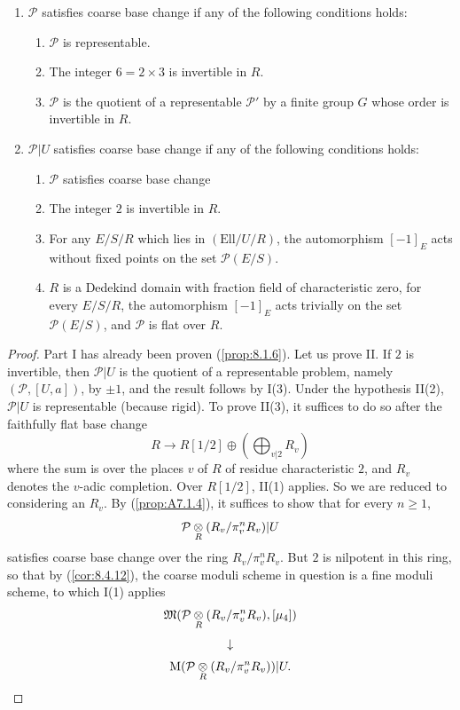 \begin{kthm}\label{thm:8.5.3}
\begin{enumerate}[label=(\Roman*), leftmargin=*]
\item $\mathcal{P}$ satisfies coarse base change if any of the following conditions holds:
\begin{enumerate}[label=(\arabic*), leftmargin=*]
\item $\mathcal{P}$ is representable.
\item The integer $6 = 2 \times 3$ is invertible in $R$.
\item $\mathcal{P}$ is the quotient of a representable $\mathcal{P}'$ by a finite group $G$ whose order is invertible in $R$.
\end{enumerate}
\item $\mathcal{P}|U$ satisfies coarse base change if any of the following conditions holds:
\begin{enumerate}[label=(\arabic*), start=0, leftmargin=*]
\item $\mathcal{P}$ satisfies coarse base change
\item The integer $2$ is invertible in $R$.
\item For any $E/S/R$ which lies in $(\mathrm{Ell}/U/R)$, the automorphism $[-1]_E$ acts without fixed points on the set $\mathcal{P}(E/S)$.
\item $R$ is a Dedekind domain with fraction field of characteristic zero, for every $E/S/R$, the automorphism $[-1]_E$ acts trivially on the set $\mathcal{P}(E/S)$, and $\mathcal{P}$ is flat over $R$.
\end{enumerate}
\end{enumerate}
\end{kthm}

\begin{proof}
Part I has already been proven (\ref{prop:8.1.6}). Let us prove II. If $2$ is invertible, then $\mathcal{P}|U$ is the quotient of a representable problem, namely $(\mathcal{P}, [U, a])$, by $\pm 1$, and the result follows by I(3). Under the hypothesis II(2), $\mathcal{P}|U$ is representable (because rigid). To prove II(3), it suffices to do so after the faithfully flat base change
\[
R \to R[1/2] \oplus ( \bigoplus_{v|2} R_v )
\]
where the sum is over the places $v$ of $R$ of residue characteristic $2$, and $R_v$ denotes the $v$-adic completion. Over $R[1/2]$, II(1) applies. So we are reduced to considering an $R_v$. By (\ref{prop:A7.1.4}), it suffices to show that for every $n \ge 1$,
\[
\mathcal{P} \underset{R}{\otimes} (R_v/\pi_v^n R_v)|U
\]
satisfies coarse base change over the ring $R_v/\pi_v^n R_v$. But $2$ is nilpotent in this ring, so that by (\ref{cor:8.4.12}), the coarse moduli scheme in question is a fine moduli scheme, to which I(1) applies
\[
\begin{gathered}[b]
\mathfrak{M}(\mathcal{P} \underset{R}{\otimes} (R_v/\pi_v^n R_v), [\mu_4]) \\[3pt]
\downarrow \\[3pt]
\mathrm{M}(\mathcal{P} \underset{R}{\otimes} (R_v/\pi_v^n R_v))|U .
\end{gathered} \qedhere
\]
\end{proof}

